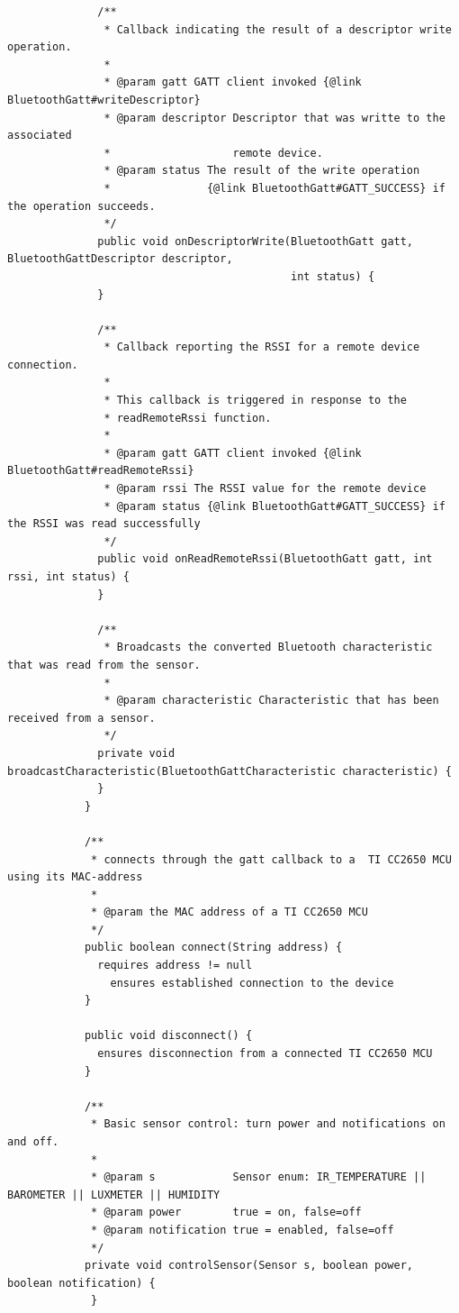 \begin{lstlisting}
              /**
               * Callback indicating the result of a descriptor write operation.
               *
               * @param gatt GATT client invoked {@link BluetoothGatt#writeDescriptor}
               * @param descriptor Descriptor that was writte to the associated
               *                   remote device.
               * @param status The result of the write operation
               *               {@link BluetoothGatt#GATT_SUCCESS} if the operation succeeds.
               */
              public void onDescriptorWrite(BluetoothGatt gatt, BluetoothGattDescriptor descriptor,
                                            int status) {
              }

              /**
               * Callback reporting the RSSI for a remote device connection.
               *
               * This callback is triggered in response to the
               * readRemoteRssi function.
               *
               * @param gatt GATT client invoked {@link BluetoothGatt#readRemoteRssi}
               * @param rssi The RSSI value for the remote device
               * @param status {@link BluetoothGatt#GATT_SUCCESS} if the RSSI was read successfully
               */
              public void onReadRemoteRssi(BluetoothGatt gatt, int rssi, int status) {
              }

              /**
               * Broadcasts the converted Bluetooth characteristic that was read from the sensor.
               *
               * @param characteristic Characteristic that has been received from a sensor.
               */
              private void broadcastCharacteristic(BluetoothGattCharacteristic characteristic) {
              }
            }

            /**
             * connects through the gatt callback to a  TI CC2650 MCU using its MAC-address
             *
             * @param the MAC address of a TI CC2650 MCU
             */
            public boolean connect(String address) {
              requires address != null
                ensures established connection to the device
            }

            public void disconnect() {
              ensures disconnection from a connected TI CC2650 MCU
            }

            /**
             * Basic sensor control: turn power and notifications on and off.
             *
             * @param s            Sensor enum: IR_TEMPERATURE || BAROMETER || LUXMETER || HUMIDITY
             * @param power        true = on, false=off
             * @param notification true = enabled, false=off
             */
            private void controlSensor(Sensor s, boolean power, boolean notification) {
             }


\end{lstlisting}
